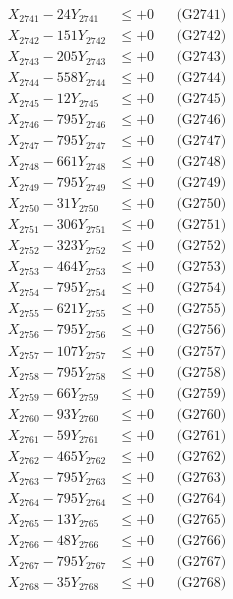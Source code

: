 \documentclass[a4paper,10pt]{article}
\begin{document}
{\begin{align}
\allowbreak
X_{2741} - 24Y_{2741} &\leq +0 && \text{(G2741)} \\
X_{2742} - 151Y_{2742} &\leq +0 && \text{(G2742)} \\
X_{2743} - 205Y_{2743} &\leq +0 && \text{(G2743)} \\
X_{2744} - 558Y_{2744} &\leq +0 && \text{(G2744)} \\
X_{2745} - 12Y_{2745} &\leq +0 && \text{(G2745)} \\
X_{2746} - 795Y_{2746} &\leq +0 && \text{(G2746)} \\
X_{2747} - 795Y_{2747} &\leq +0 && \text{(G2747)} \\
X_{2748} - 661Y_{2748} &\leq +0 && \text{(G2748)} \\
X_{2749} - 795Y_{2749} &\leq +0 && \text{(G2749)} \\
X_{2750} - 31Y_{2750} &\leq +0 && \text{(G2750)} \\
\allowbreak
X_{2751} - 306Y_{2751} &\leq +0 && \text{(G2751)} \\
X_{2752} - 323Y_{2752} &\leq +0 && \text{(G2752)} \\
X_{2753} - 464Y_{2753} &\leq +0 && \text{(G2753)} \\
X_{2754} - 795Y_{2754} &\leq +0 && \text{(G2754)} \\
X_{2755} - 621Y_{2755} &\leq +0 && \text{(G2755)} \\
X_{2756} - 795Y_{2756} &\leq +0 && \text{(G2756)} \\
X_{2757} - 107Y_{2757} &\leq +0 && \text{(G2757)} \\
X_{2758} - 795Y_{2758} &\leq +0 && \text{(G2758)} \\
X_{2759} - 66Y_{2759} &\leq +0 && \text{(G2759)} \\
X_{2760} - 93Y_{2760} &\leq +0 && \text{(G2760)} \\
\allowbreak
X_{2761} - 59Y_{2761} &\leq +0 && \text{(G2761)} \\
X_{2762} - 465Y_{2762} &\leq +0 && \text{(G2762)} \\
X_{2763} - 795Y_{2763} &\leq +0 && \text{(G2763)} \\
X_{2764} - 795Y_{2764} &\leq +0 && \text{(G2764)} \\
X_{2765} - 13Y_{2765} &\leq +0 && \text{(G2765)} \\
X_{2766} - 48Y_{2766} &\leq +0 && \text{(G2766)} \\
X_{2767} - 795Y_{2767} &\leq +0 && \text{(G2767)} \\
X_{2768} - 35Y_{2768} &\leq +0 && \text{(G2768)} \\

\end{align}}
\end{document}
